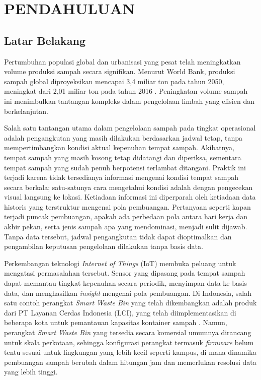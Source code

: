 \cleardoublepage
\chapter{PENDAHULUAN}
\label{chap:pendahuluan}

\section{Latar Belakang}

Pertumbuhan populasi global dan urbanisasi yang pesat telah meningkatkan volume produksi sampah secara signifikan. Menurut World Bank, produksi sampah global diproyeksikan mencapai 3,4 miliar ton pada tahun 2050, meningkat dari 2,01 miliar ton pada tahun 2016 \autocite{kaza2018}.
Peningkatan volume sampah ini menimbulkan tantangan kompleks dalam pengelolaan limbah yang efisien dan berkelanjutan.

Salah satu tantangan utama dalam pengelolaan sampah pada tingkat operasional adalah pengangkutan yang masih dilakukan berdasarkan jadwal tetap, tanpa mempertimbangkan kondisi aktual kepenuhan tempat sampah. Akibatnya, tempat sampah yang masih kosong tetap didatangi dan diperiksa, sementara tempat sampah yang sudah penuh berpotensi terlambat ditangani. Praktik ini terjadi karena tidak tersedianya informasi mengenai kondisi tempat sampah secara berkala; satu-satunya cara mengetahui kondisi adalah dengan pengecekan visual langsung ke lokasi. Ketiadaan informasi ini diperparah oleh ketiadaan data historis yang terstruktur mengenai pola pembuangan. Pertanyaan seperti kapan terjadi puncak pembuangan, apakah ada perbedaan pola antara hari kerja dan akhir pekan, serta jenis sampah apa yang mendominasi, menjadi sulit dijawab. Tanpa data tersebut, jadwal pengangkutan tidak dapat dioptimalkan dan pengambilan keputusan pengelolaan dilakukan tanpa basis data.

Perkembangan teknologi \textit{Internet of Things} (IoT) membuka peluang untuk mengatasi permasalahan tersebut. Sensor yang dipasang pada tempat sampah dapat memantau tingkat kepenuhan secara periodik, menyimpan data ke basis data, dan menghasilkan \textit{insight} mengenai pola pembuangan. Di Indonesia, salah satu contoh perangkat \textit{Smart Waste Bin} yang telah dikembangkan adalah produk dari PT Layanan Cerdas Indonesia (LCI), yang telah diimplementasikan di beberapa kota untuk pemantauan kapasitas kontainer sampah \autocite{LCI2024}. Namun, perangkat \textit{Smart Waste Bin} yang tersedia secara komersial umumnya dirancang untuk skala perkotaan, sehingga konfigurasi perangkat termasuk \textit{firmware} belum tentu sesuai untuk lingkungan yang lebih kecil seperti kampus, di mana dinamika pembuangan sampah berubah dalam hitungan jam dan memerlukan resolusi data yang lebih tinggi.


